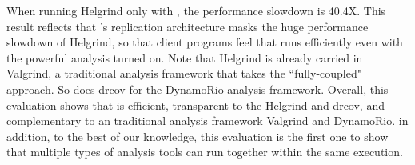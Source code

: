 When running Helgrind only with \clamav, the performance slowdown is 40.4X. This result reflects that \xxx's 
replication architecture masks the huge performance slowdown of Helgrind, so 
that client programs feel that \clamav runs efficiently even with the 
powerful analysis turned on. Note that Helgrind is already carried in Valgrind, 
a traditional analysis framework that takes the ``fully-coupled" approach. So 
does drcov for the DynamoRio analysis framework. Overall, this evaluation shows that \xxx is efficient, transparent to the 
Helgrind and drcov, and complementary to an traditional analysis framework 
Valgrind and DynamoRio. in addition, to the best of our knowledge, this 
evaluation is the first one to show that multiple types of analysis tools can 
run together within the same execution.

